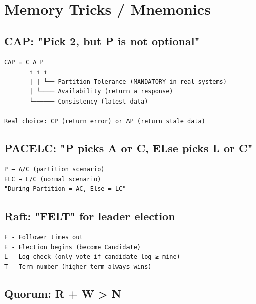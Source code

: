 \documentclass[11pt]{article}
\begin{document}
\section{Memory Tricks / Mnemonics}\label{memory-tricks--mnemonics}

\subsection{CAP: "Pick 2, but P is not optional"}\label{cap-pick-2-but-p-is-not-optional}

\setcodelang{}

\begin{verbatim}
CAP = C A P
       ↑ ↑ ↑
       | | └── Partition Tolerance (MANDATORY in real systems)
       | └──── Availability (return a response)
       └────── Consistency (latest data)

Real choice: CP (return error) or AP (return stale data)
\end{verbatim}

\subsection{PACELC: "P picks A or C, ELse picks L or C"}\label{pacelc-p-picks-a-or-c-else-picks-l-or-c}

\setcodelang{}

\begin{verbatim}
P → A/C (partition scenario)
ELC → L/C (normal scenario)
"During Partition = AC, Else = LC"
\end{verbatim}

\subsection{Raft: "FELT" for leader election}\label{raft-felt-for-leader-election}

\setcodelang{}

\begin{verbatim}
F - Follower times out
E - Election begins (become Candidate)
L - Log check (only vote if candidate log ≥ mine)
T - Term number (higher term always wins)
\end{verbatim}

\subsection{Quorum: R + W \textgreater{} N}\label{quorum-r--w--n-1}

\setcodelang{}
\end{document}

